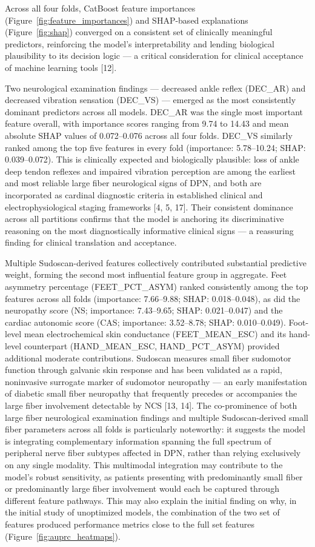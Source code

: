 \documentclass[pdflatex,sn-vancouver-num]{sn-jnl}
\begin{document}
Across all four folds, CatBoost feature importances (Figure~\ref{fig:feature_importances}) and SHAP-based explanations (Figure~\ref{fig:shap}) converged on a consistent set of clinically meaningful predictors, reinforcing the model's interpretability and lending biological plausibility to its decision logic — a critical consideration for clinical acceptance of machine learning tools [12].

Two neurological examination findings — decreased ankle reflex (DEC\_AR) and decreased vibration sensation (DEC\_VS) — emerged as the most consistently dominant predictors across all models. DEC\_AR was the single most important feature overall, with importance scores ranging from 9.74 to 14.43 and mean absolute SHAP values of 0.072–0.076 across all four folds. DEC\_VS similarly ranked among the top five features in every fold (importance: 5.78–10.24; SHAP: 0.039–0.072). This is clinically expected and biologically plausible: loss of ankle deep tendon reflexes and impaired vibration perception are among the earliest and most reliable large fiber neurological signs of DPN, and both are incorporated as cardinal diagnostic criteria in established clinical and electrophysiological staging frameworks [4, 5, 17]. Their consistent dominance across all partitions confirms that the model is anchoring its discriminative reasoning on the most diagnostically informative clinical signs — a reassuring finding for clinical translation and acceptance.

Multiple Sudoscan-derived features collectively contributed substantial predictive weight, forming the second most influential feature group in aggregate. Feet asymmetry percentage (FEET\_PCT\_ASYM) ranked consistently among the top features across all folds (importance: 7.66–9.88; SHAP: 0.018–0.048), as did the neuropathy score (NS; importance: 7.43–9.65; SHAP: 0.021–0.047) and the cardiac autonomic score (CAS; importance: 3.52–8.78; SHAP: 0.010–0.049). Foot-level mean electrochemical skin conductance (FEET\_MEAN\_ESC) and its hand-level counterpart (HAND\_MEAN\_ESC, HAND\_PCT\_ASYM) provided additional moderate contributions. Sudoscan measures small fiber sudomotor function through galvanic skin response and has been validated as a rapid, noninvasive surrogate marker of sudomotor neuropathy — an early manifestation of diabetic small fiber neuropathy that frequently precedes or accompanies the large fiber involvement detectable by NCS [13, 14]. The co-prominence of both large fiber neurological examination findings and multiple Sudoscan-derived small fiber parameters across all folds is particularly noteworthy: it suggests the model is integrating complementary information spanning the full spectrum of peripheral nerve fiber subtypes affected in DPN, rather than relying exclusively on any single modality. This multimodal integration may contribute to the model's robust sensitivity, as patients presenting with predominantly small fiber or predominantly large fiber involvement would each be captured through different feature pathways. This may also explain the initial finding on why, in the initial study of unoptimized models, the combination of the two set of features produced performance metrics close to the full set features (Figure~\ref{fig:auprc_heatmaps}).
\end{document}
